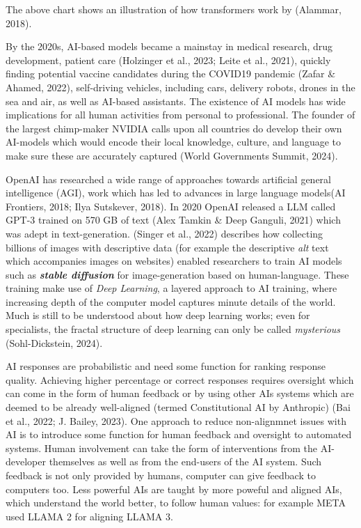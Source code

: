 \documentclass[
  12pt,
  letterpaper,
  DIV=11,
  numbers=noendperiod]{scrartcl}
\begin{document}
The above chart shows an illustration of how transformers work by
(Alammar, 2018).

By the 2020s, AI-based models became a mainstay in medical research,
drug development, patient care (Holzinger et al., 2023; Leite et al.,
2021), quickly finding potential vaccine candidates during the COVID19
pandemic (Zafar \& Ahamed, 2022), self-driving vehicles, including cars,
delivery robots, drones in the sea and air, as well as AI-based
assistants. The existence of AI models has wide implications for all
human activities from personal to professional. The founder of the
largest chimp-maker NVIDIA calls upon all countries do develop their own
AI-models which would encode their local knowledge, culture, and
language to make sure these are accurately captured (World Governments
Summit, 2024).

OpenAI has researched a wide range of approaches towards artificial
general intelligence (AGI), work which has led to advances in large
language models(AI Frontiers, 2018; Ilya Sutskever, 2018). In 2020
OpenAI released a LLM called GPT-3 trained on 570 GB of text (Alex
Tamkin \& Deep Ganguli, 2021) which was adept in text-generation.
(Singer et al., 2022) describes how collecting billions of images with
descriptive data (for example the descriptive \emph{alt} text which
accompanies images on websites) enabled researchers to train AI models
such as \textbf{\emph{stable diffusion}} for image-generation based on
human-language. These training make use of \emph{Deep Learning}, a
layered approach to AI training, where increasing depth of the computer
model captures minute details of the world. Much is still to be
understood about how deep learning works; even for specialists, the
fractal structure of deep learning can only be called \emph{mysterious}
(Sohl-Dickstein, 2024).

AI responses are probabilistic and need some function for ranking
response quality. Achieving higher percentage or correct responses
requires oversight which can come in the form of human feedback or by
using other AIs systems which are deemed to be already well-aligned
(termed Constitutional AI by Anthropic) (Bai et al., 2022; J. Bailey,
2023). One approach to reduce non-alignmnet issues with AI is to
introduce some function for human feedback and oversight to automated
systems. Human involvement can take the form of interventions from the
AI-developer themselves as well as from the end-users of the AI system.
Such feedback is not only provided by humans, computer can give feedback
to computers too. Less powerful AIs are taught by more poweful and
aligned AIs, which understand the world better, to follow human values:
for example META used LLAMA 2 for aligning LLAMA 3.
\end{document}
